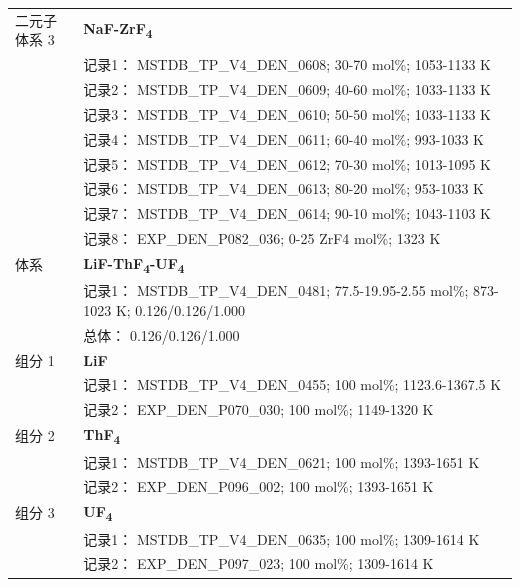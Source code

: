 \documentclass[12pt]{article}
\begin{document}
{\begin{longtable}[]{@{}
  >{\raggedright\arraybackslash}p{}
  >{\raggedright\arraybackslash}p{}@{}}
二元子体系 3  & \textbf{NaF-ZrF\textsubscript{4}} \\
 & 记录1： MSTDB\_TP\_V4\_DEN\_0608; 30-70 mol\%; 1053-1133 K \\
 & 记录2： MSTDB\_TP\_V4\_DEN\_0609; 40-60 mol\%; 1033-1133 K \\
 & 记录3： MSTDB\_TP\_V4\_DEN\_0610; 50-50 mol\%; 1033-1133 K \\
 & 记录4： MSTDB\_TP\_V4\_DEN\_0611; 60-40 mol\%; 993-1033 K \\
 & 记录5： MSTDB\_TP\_V4\_DEN\_0612; 70-30 mol\%; 1013-1095 K \\
 & 记录6： MSTDB\_TP\_V4\_DEN\_0613; 80-20 mol\%; 953-1033 K \\
 & 记录7： MSTDB\_TP\_V4\_DEN\_0614; 90-10 mol\%; 1043-1103 K \\
 & 记录8： EXP\_DEN\_P082\_036; 0-25 ZrF4 mol\%; 1323 K  \\

\midrule
体系 & \textbf{LiF-ThF\textsubscript{4}-UF\textsubscript{4}} \\
 & 记录1： MSTDB\_TP\_V4\_DEN\_0481; 77.5-19.95-2.55 mol\%; 873-1023 K; 0.126/0.126/1.000 \\
 & 总体： 0.126/0.126/1.000  \\

组分 1  & \textbf{LiF} \\
 & 记录1： MSTDB\_TP\_V4\_DEN\_0455; 100 mol\%; 1123.6-1367.5 K \\
 & 记录2： EXP\_DEN\_P070\_030; 100 mol\%; 1149-1320 K  \\

组分 2  & \textbf{ThF\textsubscript{4}} \\
 & 记录1： MSTDB\_TP\_V4\_DEN\_0621; 100 mol\%; 1393-1651 K \\
 & 记录2： EXP\_DEN\_P096\_002; 100 mol\%; 1393-1651 K  \\

组分 3  & \textbf{UF\textsubscript{4}} \\
 & 记录1： MSTDB\_TP\_V4\_DEN\_0635; 100 mol\%; 1309-1614 K \\
 & 记录2： EXP\_DEN\_P097\_023; 100 mol\%; 1309-1614 K  \\


\end{longtable}}
\end{document}
